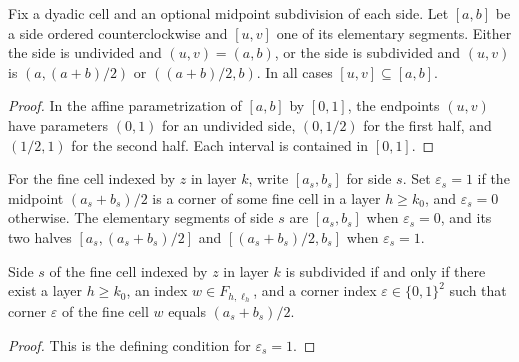 \begin{lemma}
    \label{thm:area_law_elementary_side_geometry}
    \leanok
    Fix a dyadic cell and an optional midpoint subdivision of each side.
    Let $[a,b]$ be a side ordered counterclockwise and $[u,v]$ one of its
    elementary segments. Either the side is undivided and $(u,v)=(a,b)$,
    or the side is subdivided and $(u,v)$ is $(a,(a+b)/2)$ or
    $((a+b)/2,b)$. In all cases $[u,v]\subseteq[a,b]$.
\end{lemma}
\begin{proof}\leanok
    In the affine parametrization of $[a,b]$ by $[0,1]$, the endpoints
    $(u,v)$ have parameters $(0,1)$ for an undivided side,
    $(0,1/2)$ for the first half, and $(1/2,1)$ for the second half.
    Each interval is contained in $[0,1]$.
\end{proof}

\begin{definition}
    \label{def:area_law_actual_side_mask}
    \leanok
    For the fine cell indexed by $z$ in layer $k$, write $[a_s,b_s]$
    for side $s$. Set $\varepsilon_s=1$ if the midpoint
    $(a_s+b_s)/2$ is a corner of some fine cell in a layer $h\ge k_0$,
    and $\varepsilon_s=0$ otherwise. The elementary segments of side $s$
    are $[a_s,b_s]$ when $\varepsilon_s=0$, and its two halves
    $[a_s,(a_s+b_s)/2]$ and $[(a_s+b_s)/2,b_s]$ when $\varepsilon_s=1$.
\end{definition}

\begin{lemma}
    \label{thm:area_law_actual_side_mask_iff}
    \leanok
    Side $s$ of the fine cell indexed by $z$ in layer $k$ is subdivided if
    and only if there exist a layer $h\ge k_0$, an index $w\in F_{h,\ell_h}$,
    and a corner index $\varepsilon\in\{0,1\}^2$ such that corner
    $\varepsilon$ of the fine cell $w$ equals $(a_s+b_s)/2$.
\end{lemma}
\begin{proof}\leanok
    This is the defining condition for $\varepsilon_s=1$.
\end{proof}

